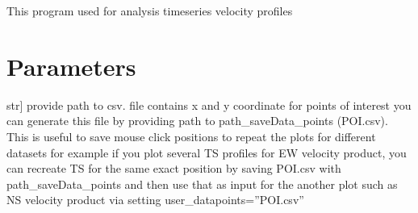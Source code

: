 \documentclass[letterpaper,10pt]{sphinxmanual}
\begin{document}
\begin{fulllineitems}
\label{\detokenize{generated/akhdefo_functions.akhdefo_ts_plot:akhdefo_functions.akhdefo_ts_plot}}
\pysigstartsignatures
{}
\pysigstopsignatures
\sphinxAtStartPar
This program used for analysis time\sphinxhyphen{}series velocity profiles


\section{Parameters}
\label{\detokenize{generated/akhdefo_functions.akhdefo_ts_plot:parameters}}\begin{description}
\sphinxlineitem{user\_data\_points}{[}str{]}
\sphinxAtStartPar
provide path to csv. file contains x and y coordinate for points of interest
you can generate this file by providing path to path\_saveData\_points (POI.csv).
This is useful to save mouse click positions to repeat the plots for different datasets for example if you plot several TS profiles for
EW velocity product, you can recreate TS for the same exact position by saving POI.csv with path\_saveData\_points and then use that as input for the another
plot such as NS velocity product via setting user\_datapoints=”POI.csv”


\end{description}
\end{fulllineitems}
\end{document}
